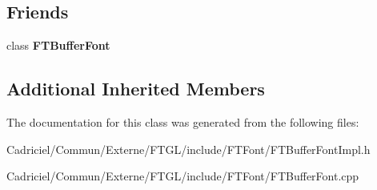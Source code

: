 \subsection*{Friends}
\begin{DoxyCompactItemize}
\item 
class {\bfseries F\+T\+Buffer\+Font}\hypertarget{class_f_t_buffer_font_impl_ab7dc21f40be33fee50c41b3ba3d49c73}{}\label{class_f_t_buffer_font_impl_ab7dc21f40be33fee50c41b3ba3d49c73}

\end{DoxyCompactItemize}
\subsection*{Additional Inherited Members}


The documentation for this class was generated from the following files\+:\begin{DoxyCompactItemize}
\item 
Cadriciel/\+Commun/\+Externe/\+F\+T\+G\+L/include/\+F\+T\+Font/F\+T\+Buffer\+Font\+Impl.\+h\item 
Cadriciel/\+Commun/\+Externe/\+F\+T\+G\+L/include/\+F\+T\+Font/F\+T\+Buffer\+Font.\+cpp\end{DoxyCompactItemize}
